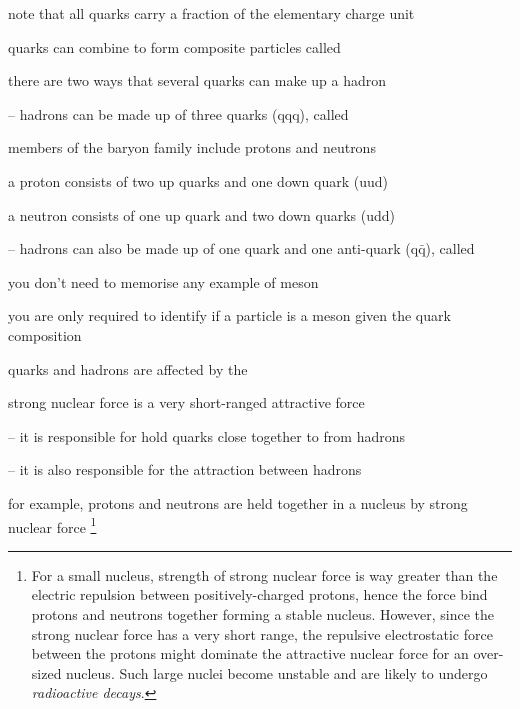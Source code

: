 note that all quarks carry a fraction of the elementary charge unit

\cmt quarks can combine to form composite particles called 

there are two ways that several quarks can make up a hadron

\begin{compactenum}
	\item[--] hadrons can be made up of three quarks (qqq), called 
	
	members of the baryon family include protons and neutrons
	
	a proton consists of two up quarks and one down quark (uud)
	
	a neutron consists of one up quark and two down quarks (udd)
	
	\item[--] hadrons can also be made up of one quark and one anti-quark (q$\bar{\text{q}}$), called 
	
	you don't need to memorise any example of meson
	
	you are only required to identify if a particle is a meson given the quark composition
\end{compactenum}

\cmt quarks and hadrons are affected by the 

strong nuclear force is a very short-ranged attractive force

\begin{compactenum}
	\item[--] it is responsible for hold quarks close together to from hadrons

	\item[--] it is also responsible for the attraction between hadrons
	
	for example, protons and neutrons are held together in a nucleus by strong nuclear force
	\footnote{For a small nucleus, strength of strong nuclear force is way greater than the electric repulsion between positively-charged protons, hence the force bind protons and neutrons together forming a stable nucleus. However, since the strong nuclear force has a very short range, the repulsive electrostatic force between the protons might dominate the attractive nuclear force for an over-sized nucleus. Such large nuclei become unstable and are likely to undergo \emph{radioactive decays}.}
\end{compactenum}


